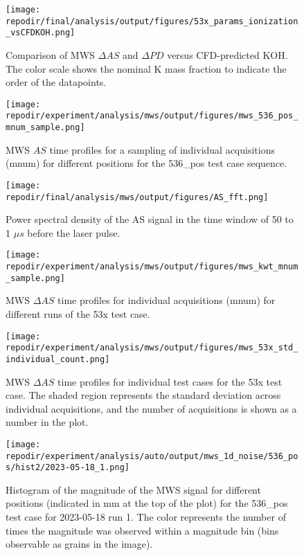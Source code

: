 \begin{figure}[h]
    \centering
    \texttt{[image: \\repodir/final/analysis/output/figures/53x\_params\_ionization\_vsCFDKOH.png]} 
    \caption{Comparison of MWS $\Delta AS$ and $\Delta PD$ versus CFD-predicted KOH. The color scale shows the nominal K mass fraction to indicate the order of the datapoints.}
    \label{fig:SI_53x_params_ionization_vsCFDKOH}
\end{figure}



\begin{figure}[]
\centering
\texttt{[image: \\repodir/experiment/analysis/mws/output/figures/mws\_536\_pos\_mnum\_sample.png]}
\caption{MWS $AS$ time profiles for a sampling of individual acquisitions (mnum) for different positions for the 536\_pos test case sequence.}
\label{fig:SI_mws_536_pos_mnum_sample}
\end{figure}

\begin{figure}
    \centering
    \texttt{[image: \\repodir/final/analysis/mws/output/figures/AS\_fft.png]} 
    \caption{Power spectral density of the AS signal in the time window of 50 to 1 $\mu s$ before the laser pulse.}
    \label{fig:SI_AS_fft}
\end{figure}

\begin{figure}
    \centering
    \texttt{[image: \\repodir/experiment/analysis/mws/output/figures/mws\_kwt\_mnum\_sample.png]} 
    \caption{MWS $\Delta AS$ time profiles for individual acquisitions (mnum) for different runs of the 53x test case.  }
    \label{fig:SI_mws_kwt_mnum_sample}
\end{figure}

\begin{figure}
    \centering
    \texttt{[image: \\repodir/experiment/analysis/mws/output/figures/mws\_53x\_std\_individual\_count.png]} 
    \caption{MWS $\Delta AS$ time profiles for individual test cases for the 53x test case. The shaded region represents the standard deviation across individual acquisitions, and the number of acquisitions is shown as a number in the plot.}
    \label{fig:SI_mws_53x_std_individual_count}
\end{figure}

\begin{figure}
    \centering
    \texttt{[image: \\repodir/experiment/analysis/auto/output/mws\_1d\_noise/536\_pos/hist2/2023-05-18\_1.png]} 
    \caption{Histogram of the magnitude of the MWS signal for different positions (indicated in mm at the top of the plot) for the 536\_pos test case for 2023-05-18 run 1. The color represents the number of times the magnitude was observed within a magnitude bin (bins observable as grains in the image). }
    \label{fig:SI_mws_1d_noise_536_pos_hist2_2023-05-18_1}
\end{figure}

